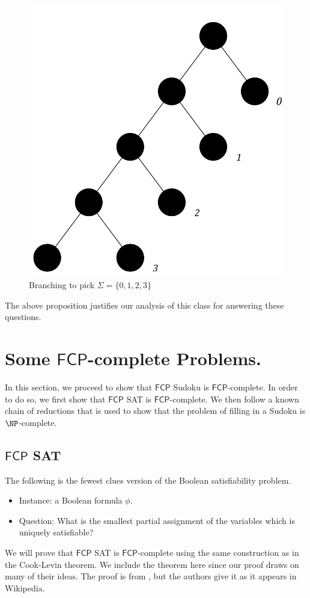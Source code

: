 \documentclass[runningheads,a4paper]{llncs}
\begin{document}
\begin{figure}
\centering
\label{fig:branching}
\includegraphics[width=0.4\linewidth]{branching.pdf}
\caption{Branching to pick $\Sigma = \{ 0, 1, 2, 3 \}$}
\end{figure}

The above proposition justifies our analysis of this class for answering these questions.

\section{Some $\mathsf{FCP}$-complete Problems.}
\label{sec:The Problems}

In this section, we proceed to show that $\mathsf{FCP}$ Sudoku is $\mathsf{FCP}$-complete. In order to do so, we first show that $\mathsf{FCP}$ SAT is $\mathsf{FCP}$-complete. We then follow a known chain of reductions that is used to show that the problem of filling in a Sudoku is $\NP$-complete. 

\subsection{$\mathsf{FCP}$ SAT}
The following is the fewest clues version of the Boolean satisfiability problem.

\begin{itemize}
\item Instance: a Boolean formula $\phi$.
\item Question: What is the smallest partial assignment of the variables which is uniquely satisfiable?
\end{itemize}

We will prove that $\mathsf{FCP}$ SAT is $\mathsf{FCP}$-complete using the same construction as in the Cook-Levin theorem. We include the theorem here since our proof draws on many of their ideas. The proof is from \cite{Garey}, but the authors give it as it appears in Wikipedia.
\end{document}
